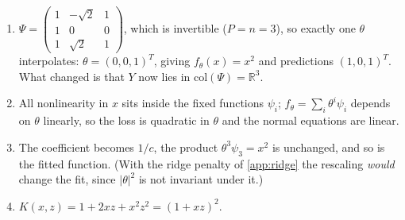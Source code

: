 \documentclass[11pt]{article}
\newcommand{\R}{\mathbb{R}}
\begin{document}
\begin{solution}
\begin{enumerate}
    \item $\Psi = \begin{pmatrix} 1 & -\sqrt2 & 1 \\ 1 & 0 & 0 \\ 1 & \sqrt2 & 1\end{pmatrix}$, which is invertible ($P=n=3$), so exactly one $\theta$ interpolates: $\theta = (0,0,1)^T$, giving $f_\theta(x) = x^2$ and predictions $(1,0,1)^T$. What changed is that $Y$ now lies in $\mathrm{col}(\Psi) = \R^3$.
    \item All nonlinearity in $x$ sits inside the fixed functions $\psi_i$; $f_\theta = \sum_i\theta^i\psi_i$ depends on $\theta$ linearly, so the loss is quadratic in $\theta$ and the normal equations are linear.
    \item The coefficient becomes $1/c$, the product $\theta^3\psi_3 = x^2$ is unchanged, and so is the fitted function. (With the ridge penalty of \cref{app:ridge} the rescaling \emph{would} change the fit, since $|\theta|^2$ is not invariant under it.)
    \item $K(x,z) = 1+2xz+x^2z^2 = (1+xz)^2$.
\end{enumerate}
\end{solution}
\end{document}
